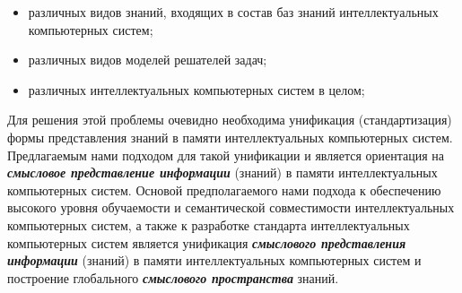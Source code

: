 \begin{scnsubstruct}
{        \begin{itemize}
            \item различных видов знаний, входящих в состав баз знаний интеллектуальных компьютерных систем;
            \item различных видов моделей решателей задач;
            \item различных интеллектуальных компьютерных систем в целом;
        \end{itemize}
        Для решения этой проблемы очевидно необходима унификация (стандартизация) формы представления знаний в памяти интеллектуальных компьютерных систем. Предлагаемым нами подходом для такой унификации и является ориентация на \textbf{\textit{смысловое представление информации}} (знаний) в памяти интеллектуальных компьютерных систем. Основой предполагаемого нами подхода к обеспечению высокого уровня обучаемости и семантической совместимости интеллектуальных компьютерных систем, а также к разработке стандарта интеллектуальных компьютерных систем является унификация \textbf{\textit{смыслового представления информации}} (знаний) в памяти интеллектуальных компьютерных систем и построение глобального \textbf{\textit{смыслового пространства}} знаний.}
        \begin{scnindent}
    	\end{scnindent}
    

\end{scnsubstruct}
